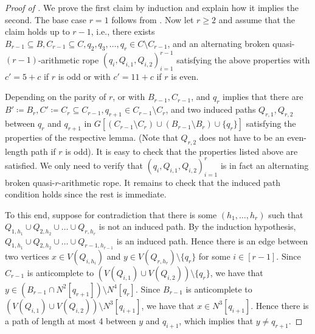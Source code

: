 \documentclass{article}
\begin{document}
\begin{proof}[Proof of ]

    We prove the first claim by induction and explain how it implies the second.
    The base case $r = 1$ follows from . Now let $r \geq 2$ and assume that the claim holds up to $r - 1$, i.e., there exists $B_{r-1} \subseteq B, C_{r - 1} \subseteq C, q_2, q_3, \dots, q_r \in C \setminus C_{r- 1}$, and an alternating broken quasi-$(r-1)$-arithmetic rope $(q_i, Q_{i, 1}, Q_{i, 2})_{i = 1}^{r - 1}$ satisfying the above properties with $c' =  5 + c$ if $r$ is odd or with $c' = 11 + c$ if $r$ is even.
    
    Depending on the parity of $r$,  or  with $B_{r-1}, C_{r-1}$, and $q_r$ implies that there are $B' \coloneqq B_r, C' \coloneqq C_r \subseteq C_{r - 1}, q_{r + 1} \in C_{r - 1} \setminus C_r$, and two induced paths $Q_{r, 1}, Q_{r,2}$ between $q_r$ and $q_{r + 1}$ in $G\left[ (C_{r - 1} \setminus C_r ) \cup (B_{r - 1} \setminus B_r) \cup \{q_{r}\} \right]$ satisfying the properties of the respective lemma. (Note that $Q_{r, 2}$ does not have to be an even-length path if $r$ is odd). 
    It is easy to check that the properties listed above are satisfied. We only need to verify that $(q_i, Q_{i, 1}, Q_{i, 2})_{i = 1}^r$ is in fact an alternating broken quasi-$r$-arithmetic rope. It remains to check that the induced path condition holds since the rest is immediate.
    
    To this end, suppose for contradiction that there is some $(h_1, \dots, h_r)$ such that $Q_{1, h_1} \cup Q_{2, h_2 } \cup \dots \cup Q_{r, h_r}$ is not an induced path.
    By the induction hypothesis, $Q_{1, h_1} \cup Q_{2, h_2 } \cup\dots \cup Q_{r - 1, h_{r - 1}}$ is an induced path. Hence there is an edge between two vertices $x \in V(Q_{i, h_{i}})$ and $y \in V(Q_{r, h_r}) \setminus \{q_r\}$ for some $i \in [r - 1]$. Since $C_{r - 1}$ is anticomplete to $(V(Q_{i, 1}) \cup V(Q_{i, 2})) \setminus \{q_r\}$, we have that $y \in (B_{r - 1} \cap N^2[q_{r + 1}]) \setminus N^4[q_r]$. Since $B_{r - 1}$ is anticomplete to $(V(Q_{i, 1}) \cup V(Q_{i, 2})) \setminus N^3[q_{i + 1}]$, we have that $x \in N^3[q_{i + 1}]$. Hence there is a path of length at most 4 between $y$ and $q_{i + 1}$, which implies that $y \neq q_{r + 1}$. 
    

\end{proof}
\end{document}
